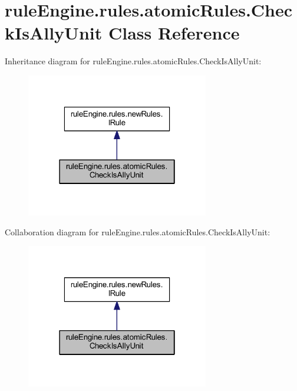 \hypertarget{classrule_engine_1_1rules_1_1atomic_rules_1_1_check_is_ally_unit}{}\section{rule\+Engine.\+rules.\+atomic\+Rules.\+Check\+Is\+Ally\+Unit Class Reference}
\label{classrule_engine_1_1rules_1_1atomic_rules_1_1_check_is_ally_unit}


Inheritance diagram for rule\+Engine.\+rules.\+atomic\+Rules.\+Check\+Is\+Ally\+Unit\+:
\nopagebreak
\begin{figure}[H]
\begin{center}
\leavevmode
\includegraphics[width=226pt]{classrule_engine_1_1rules_1_1atomic_rules_1_1_check_is_ally_unit__inherit__graph}
\end{center}
\end{figure}


Collaboration diagram for rule\+Engine.\+rules.\+atomic\+Rules.\+Check\+Is\+Ally\+Unit\+:
\nopagebreak
\begin{figure}[H]
\begin{center}
\leavevmode
\includegraphics[width=226pt]{classrule_engine_1_1rules_1_1atomic_rules_1_1_check_is_ally_unit__coll__graph}
\end{center}
\end{figure}
